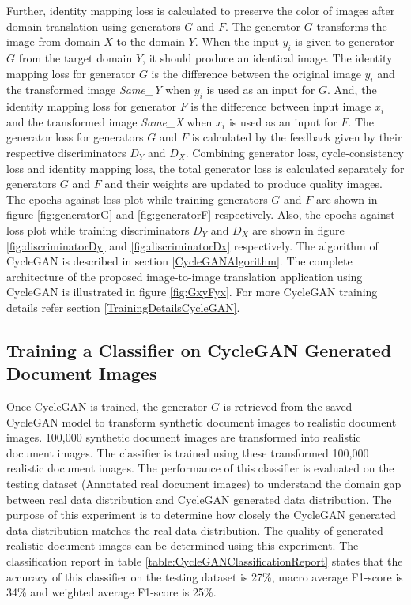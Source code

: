 Further, identity mapping loss is calculated to preserve the color of images after domain translation using generators $G$ and $F$. The generator $G$ transforms the image from domain $X$ to the domain $Y$. When the input $y_i$ is given to generator $G$ from the target domain $Y$, it should produce an identical image. The identity mapping loss for generator $G$ is the difference between the original image $y_i$ and the transformed image \textit{Same\_Y} when $y_i$ is used as an input for $G$. And, the identity mapping loss for generator $F$ is the difference between input image $x_i$ and the transformed image \textit{Same\_X} when $x_i$ is used as an input for $F$. The generator loss for generators $G$ and $F$ is calculated by the feedback given by their respective discriminators $D_Y$ and $D_X$. Combining generator loss, cycle-consistency loss and identity mapping loss, the total generator loss is calculated separately for generators $G$ and $F$ and their weights are updated to produce quality images. The epochs against loss plot while training generators $G$ and $F$ are shown in figure \ref{fig:generatorG} and \ref{fig:generatorF} respectively. Also, the epochs against loss plot while training discriminators $D_Y$ and $D_X$ are shown in figure \ref{fig:discriminatorDy} and \ref{fig:discriminatorDx} respectively. The algorithm of \ac{CycleGAN} is described in section \ref{CycleGANAlgorithm}. The complete architecture of the proposed image-to-image translation application using \ac{CycleGAN} is illustrated in figure \ref{fig:GxyFyx}. For more \ac{CycleGAN} training details refer section \ref{TrainingDetailsCycleGAN}. 




\subsection{Training a Classifier on \ac{CycleGAN} Generated Document Images}\label{trainingCycleGANDataClassifier}


Once \ac{CycleGAN} is trained, the generator $G$ is retrieved from the saved \ac{CycleGAN} model to transform synthetic document images to realistic document images. 100,000 synthetic document images are transformed into realistic document images. The classifier is trained using these transformed 100,000 realistic document images. The performance of this classifier is evaluated on the testing dataset (Annotated real document images) to understand the domain gap between real data distribution and \ac{CycleGAN} generated data distribution. The purpose of this experiment is to determine how closely the \ac{CycleGAN} generated data distribution matches the real data distribution. The quality of generated realistic document images can be determined using this experiment. The classification report in table \ref{table:CycleGANClassificationReport} states that the accuracy of this classifier on the testing dataset is 27\%, macro average F1-score is 34\% and weighted average F1-score is 25\%. 


